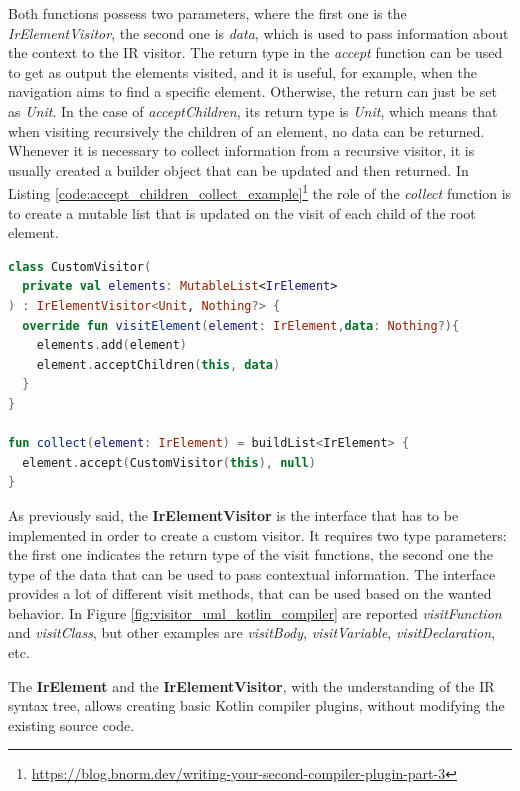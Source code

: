 Both functions possess two parameters, where the first one is the \textit{IrElementVisitor}, the second one is \textit{data}, which is used to pass information about the context to the IR visitor.\newline
The return type in the \textit{accept} function can be used to get as output the elements visited, and it is useful, for example, when the navigation aims to find a specific element. Otherwise, the return can just be set as \textit{Unit}.\newline
In the case of \textit{acceptChildren}, its return type is \textit{Unit}, which means that when visiting recursively the children of an element, no data can be returned. Whenever it is necessary to collect information from a recursive visitor, it is usually created a builder object that can be updated and then returned. In Listing \ref{code:accept_children_collect_example}\footnote{\url{https://blog.bnorm.dev/writing-your-second-compiler-plugin-part-3}} the role of the \textit{collect} function is to create a mutable list that is updated on the visit of each child of the root element.
\begin{lstlisting}[caption={Example of a custom visitor and a function that supports the collection of elements}, captionpos=b, language=Kotlin, label={code:accept_children_collect_example}]
class CustomVisitor(
  private val elements: MutableList<IrElement>
) : IrElementVisitor<Unit, Nothing?> {
  override fun visitElement(element: IrElement,data: Nothing?){
    elements.add(element)
    element.acceptChildren(this, data)
  }
}

fun collect(element: IrElement) = buildList<IrElement> {
  element.accept(CustomVisitor(this), null)
}
\end{lstlisting}

As previously said, the \textbf{IrElementVisitor} is the interface that has to be implemented in order to create a custom visitor. It requires two type parameters: the first one indicates the return type of the visit functions, the second one the type of the data that can be used to pass contextual information. The interface provides a lot of different visit methods, that can be used based on the wanted behavior. In Figure \ref{fig:visitor_uml_kotlin_compiler} are reported \textit{visitFunction} and \textit{visitClass}, but other examples are \textit{visitBody}, \textit{visitVariable}, \textit{visitDeclaration}, etc.

The \textbf{IrElement} and the \textbf{IrElementVisitor}, with the understanding of the IR syntax tree, allows creating basic Kotlin compiler plugins, without modifying the existing source code.

